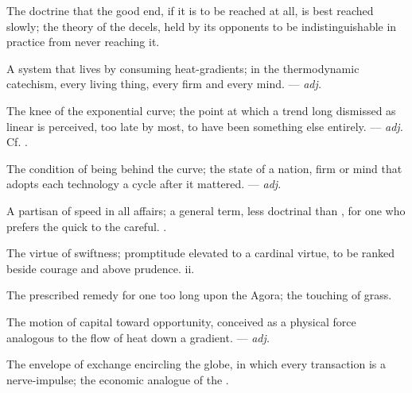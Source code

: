  The doctrine that the good end, if it is to be reached at all, is best reached slowly; the theory of the decels, held by its opponents to be indistinguishable in practice from never reaching it.

 A system that lives by consuming heat-gradients; in the thermodynamic catechism, every living thing, every firm and every mind.   ---  \textit{adj.}

 The knee of the exponential curve; the point at which a trend long dismissed as linear is perceived, too late by most, to have been something else entirely.   ---  \textit{adj.} Cf. .

 The condition of being behind the curve; the state of a nation, firm or mind that adopts each technology a cycle after it mattered. ---  \textit{adj.}

 A partisan of speed in all affairs; a general term, less doctrinal than , for one who prefers the quick to the careful. .

 The virtue of swiftness; promptitude elevated to a cardinal virtue, to be ranked beside courage and above prudence.   ii.

  The prescribed remedy for one too long upon the Agora; the touching of grass. 

 The motion of capital toward opportunity, conceived as a physical force analogous to the flow of heat down a gradient. ---  \textit{adj.}

 The envelope of exchange encircling the globe, in which every transaction is a nerve-impulse; the economic analogue of the .

